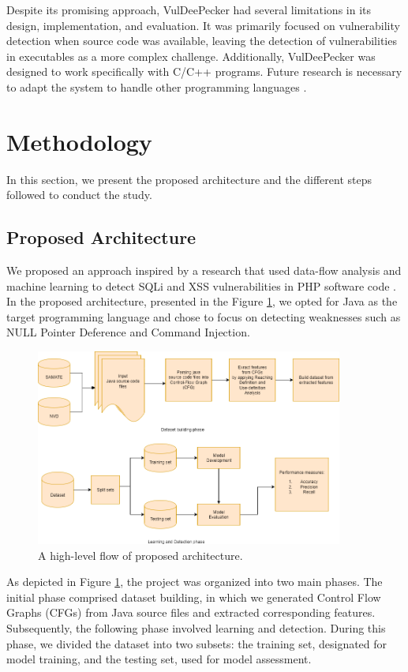 \documentclass[journal,a4paper]{IEEEtran}
\begin{document}
Despite its promising approach, VulDeePecker had several limitations in its design, implementation, and evaluation. It was primarily focused on vulnerability detection when source code was available, leaving the detection of vulnerabilities in executables as a more complex challenge. Additionally, VulDeePecker was designed to work specifically with C/C++ programs. Future research is necessary to adapt the system to handle other programming languages \cite{Zhen_Li2018}.

\section{Methodology}
In this section, we present the proposed architecture and the different steps followed to conduct the study.

\subsection{Proposed Architecture}

We proposed an approach inspired by a research that used data-flow analysis and machine learning to detect SQLi and XSS vulnerabilities in PHP software code \cite{Kronjee2018}. In the proposed architecture, presented in the Figure \ref{fig:archquitecture}, we opted for Java as the target programming language and chose to focus on detecting weaknesses such as NULL Pointer Deference and Command Injection.

\begin{figure}
  \centering
  \includegraphics*[width=0.90\textwidth]{Architecture3}
  \caption{A high-level flow of proposed architecture.}
  \label{fig:archquitecture}
\end{figure}

As depicted in Figure \ref{fig:archquitecture}, the project was organized into two main phases. The initial phase comprised dataset building, in which we generated Control Flow Graphs (CFGs) from Java source files and extracted corresponding features. Subsequently, the following phase involved learning and detection. During this phase, we divided the dataset into two subsets: the training set, designated for model training, and the testing set, used for model assessment.
\end{document}
